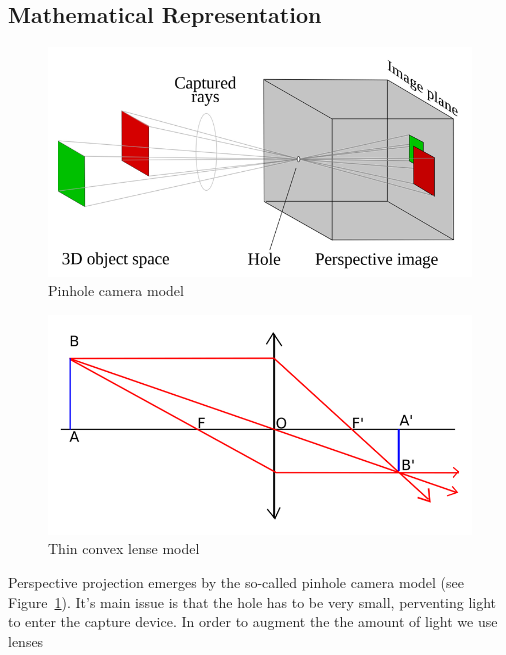 \subsection{Mathematical Representation}%
\label{sub:mathematical_representation}


\begin{figure}[h]
\centering
\includegraphics[width=\columnwidth]{img/pinhole_camera.png}
\caption{Pinhole camera model}%
\label{fig:pinhole_camera}
\end{figure}

\begin{figure}[h]
\centering
\includegraphics[width=\columnwidth]{img/convex_lense.png}
\caption{Thin convex lense model}%
\label{fig:convex_lense}
\end{figure}

Perspective projection emerges by the so-called pinhole camera model
(see Figure~\ref{fig:pinhole_camera}).
It's main issue is that the hole has to be very small,
perventing light to enter the capture device.
In order to augment the the amount of light we use lenses\\

